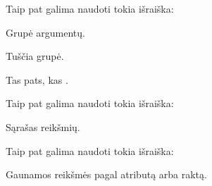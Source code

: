 \documentclass[letterpaper,10pt,lithuanian]{sphinxmanual}
\begin{document}
\begin{fulllineitems}
\label{\detokenize{formules:tuple}}
\pysigstartsignatures
\pysiglinewithargsret
{}
{}
{}
\pysigstopsignatures
\sphinxAtStartPar
Taip pat galima naudoti tokia išraiška:

\begin{sphinxVerbatim}[commandchars=\\\{\}]
\end{sphinxVerbatim}

\sphinxAtStartPar
Grupė argumentų.
\begin{description}
\sphinxlineitem{()}
\sphinxAtStartPar
Tuščia grupė.

\sphinxAtStartPar
Tas pats, kas .

\end{description}

\end{fulllineitems}


\begin{fulllineitems}
\label{\detokenize{formules:list}}
\pysigstartsignatures
\pysiglinewithargsret
{}
{}
{}
\pysigstopsignatures
\sphinxAtStartPar
Taip pat galima naudoti tokia išraiška:

\begin{sphinxVerbatim}[commandchars=\\\{\}]
\PYG{p}{[}\PYG{p}{]}
\end{sphinxVerbatim}

\sphinxAtStartPar
Sąrašas reikšmių.

\end{fulllineitems}


\begin{fulllineitems}
\label{\detokenize{formules:getattr}}
\pysigstartsignatures
\pysiglinewithargsret
{}
{\sphinxparamcomma {}}
{}
\pysigstopsignatures
\sphinxAtStartPar
Taip pat galima naudoti tokia išraiška:

\begin{sphinxVerbatim}[commandchars=\\\{\}]
\end{sphinxVerbatim}

\sphinxAtStartPar
Gaunamos reikšmės pagal atributą arba raktą.

\end{fulllineitems}
\end{document}
